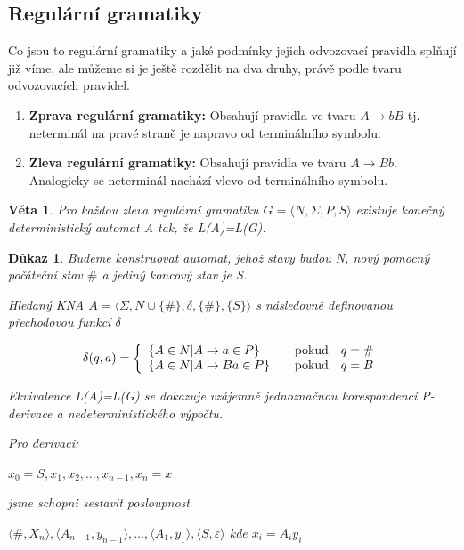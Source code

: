\documentclass[10pt, a4paper, titlepage]{article}
\theoremstyle{note}
\newtheorem{dukaz}{Důkaz}
\newtheorem{veta}{Věta}
\begin{document}
\subsection{Regulární gramatiky}

Co jsou to regulární gramatiky a jaké podmínky jejich odvozovací pravidla splňují již víme, ale můžeme si je ještě rozdělit na dva druhy, právě podle tvaru odvozovacích pravidel.

\begin{enumerate}

\item
\textbf{Zprava regulární gramatiky:}
Obsahují pravidla ve tvaru $ A \rightarrow bB $ tj. neterminál na pravé straně je napravo od terminálního symbolu.
\item
\textbf{Zleva regulární gramatiky:}
Obsahují pravidla ve tvaru $ A \rightarrow Bb $. Analogicky se neterminál nachází vlevo od terminálního symbolu.
\end{enumerate}

\begin{veta}
Pro každou zleva regulární gramatiku $ G = \langle N,\Sigma,P,S \rangle $ existuje konečný deterministický automat \textit{A} tak, že \textit{L(A)=L(G)}.
\end{veta}

\begin{dukaz}
Budeme konstruovat automat, jehož stavy budou \textit{N}, nový pomocný počáteční stav $ \# $ a jediný koncový stav je \textit{S}.

Hledaný KNA $ A = \langle \Sigma,N \cup \lbrace \# \rbrace,\delta,\lbrace \# \rbrace,\lbrace S \rbrace \rangle$ s následovně definovanou přechodovou funkcí $\delta$

$$
\delta(q,a)=\left\{
\begin{array}{l@{\quad\mbox{}\quad}l}
\lbrace A \in N | A \rightarrow a \in P \rbrace & \text{pokud}\quad q=\#\\
\lbrace A \in N | A \rightarrow Ba \in P \rbrace & \text{pokud}\quad q=B\\
\end{array}
\right.
$$ 

Ekvivalence \textit{L(A)=L(G)} se dokazuje vzájemně jednoznačnou korespondencí P-derivace a nedeterministického výpočtu.

Pro derivaci:

$ x_0=S,x_1,x_2,\ldots,x_{n-1},x_n=x $

jsme schopni sestavit posloupnost

$ \langle \# , X_n \rangle,\langle A_{n-1} , y_{n-1} \rangle,\ldots,\langle A_1 , y_1 \rangle,\langle S , \varepsilon \rangle $ kde $x_i=A_{i}y_{i}$
\end{dukaz}
\end{document}
